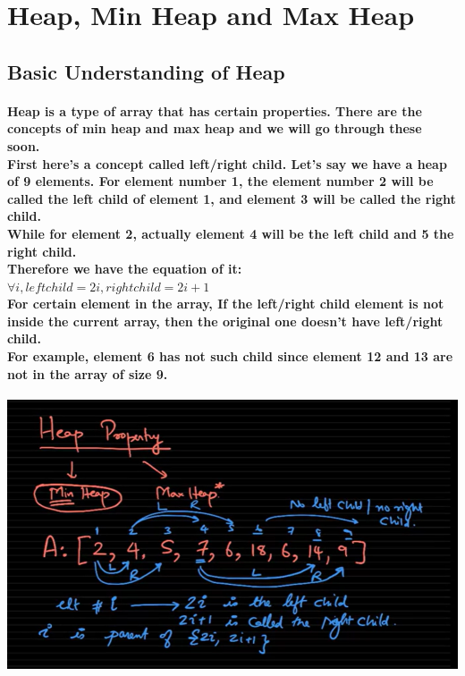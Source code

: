 \documentclass{article}
\begin{document}
\newpage

\section{Heap, Min Heap and Max Heap}

\subsection{Basic Understanding of Heap}

\paragraph{Heap is a type of array that has certain properties. There are the concepts of min heap and max heap and we will go through these soon.\\
First here's a concept called left/right child. Let's say we have a heap of 9 elements. For element number 1, the element number 2 will be called the left child of element 1, and element 3 will be called the right child.\\
While for element 2, actually element 4 will be the left child and 5 the right child.\\
Therefore we have the equation of it:\\
$\forall i,leftchild = 2i,rightchild = 2i + 1$\\
For certain element in the array, If the left/right child element is not inside the current array, then the original one doesn't have left/right child.\\
For example, element 6 has not such child since element 12 and 13 are not in the array of size 9.\\}


\includegraphics[width=\textwidth]{heapproperty}
\end{document}
